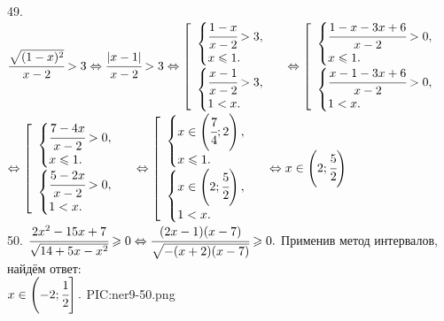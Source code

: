 49. $\cfrac{\sqrt{(1-x)^2}}{x-2}>3\Leftrightarrow\cfrac{|x-1|}{x-2}>3\Leftrightarrow\left[\begin{array}{l} \begin{cases} \cfrac{1-x}{x-2}>3,\\
x\leqslant1.\end{cases}\\ \begin{cases} \cfrac{x-1}{x-2}>3,\\ 1<x.\end{cases}\end{array}\right.\Leftrightarrow\left[\begin{array}{l} \begin{cases} \cfrac{1-x-3x+6}{x-2}>0,\\ x\leqslant1.\end{cases}\\ \begin{cases} \cfrac{x-1-3x+6}{x-2}>0,\\ 1<x.\end{cases}\end{array}\right.$\\$\Leftrightarrow\left[\begin{array}{l} \begin{cases} \cfrac{7-4x}{x-2}>0,\\ x\leqslant1.\end{cases}\\ \begin{cases} \cfrac{5-2x}{x-2}>0,\\ 1<x.\end{cases}\end{array}\right.\Leftrightarrow\left[\begin{array}{l} \begin{cases} x\in\left(\cfrac{7}{4};2\right),\\ x\leqslant1.\end{cases}\\ \begin{cases} x\in\left(2;\cfrac{5}{2}\right),\\ 1<x.\end{cases}\end{array}\right.\Leftrightarrow x\in\left(2;\cfrac{5}{2}\right)$\\
50. $\cfrac{2x^2-15x+7}{\sqrt{14+5x-x^2}}\geqslant0\Leftrightarrow\cfrac{(2x-1)(x-7)}{\sqrt{-(x+2)(x-7)}}\geqslant0.$ Применив метод интервалов, найдём ответ:\\ $x\in\left(-2;\cfrac{1}{2}\right].$
{{PIC:ner9-50.png}}\\
